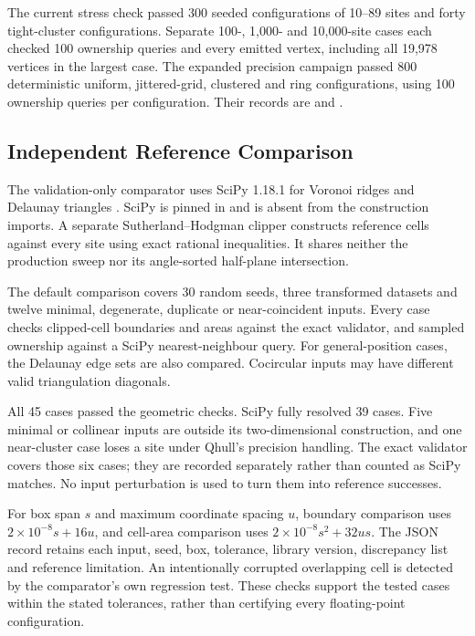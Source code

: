 The current stress check passed 300 seeded configurations of 10--89 sites and forty tight-cluster configurations. Separate 100-, 1,000- and 10,000-site cases each checked 100 ownership queries and every emitted vertex, including all 19,978 vertices in the largest case. The expanded precision campaign passed 800 deterministic uniform, jittered-grid, clustered and ring configurations, using 100 ownership queries per configuration. Their records are  and .

\clearpage
\subsection{Independent Reference Comparison}

The validation-only comparator uses SciPy 1.18.1 for Voronoi ridges and Delaunay triangles \cite{scipyvoronoi,scipydelaunay}. SciPy is pinned in  and is absent from the construction imports. A separate Sutherland--Hodgman clipper constructs reference cells against every site using exact rational inequalities. It shares neither the production sweep nor its angle-sorted half-plane intersection.

The default comparison covers 30 random seeds, three transformed datasets and twelve minimal, degenerate, duplicate or near-coincident inputs. Every case checks clipped-cell boundaries and areas against the exact validator, and sampled ownership against a SciPy nearest-neighbour query. For general-position cases, the Delaunay edge sets are also compared. Cocircular inputs may have different valid triangulation diagonals.

All 45 cases passed the geometric checks. SciPy fully resolved 39 cases. Five minimal or collinear inputs are outside its two-dimensional construction, and one near-cluster case loses a site under Qhull's precision handling. The exact validator covers those six cases; they are recorded separately rather than counted as SciPy matches. No input perturbation is used to turn them into reference successes.

For box span $s$ and maximum coordinate spacing $u$, boundary comparison uses $2\times10^{-8}s+16u$, and cell-area comparison uses $2\times10^{-8}s^2+32us$. The JSON record retains each input, seed, box, tolerance, library version, discrepancy list and reference limitation. An intentionally corrupted overlapping cell is detected by the comparator's own regression test. These checks support the tested cases within the stated tolerances, rather than certifying every floating-point configuration.

